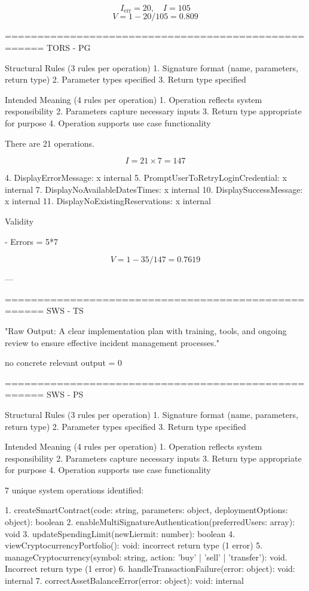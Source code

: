 \[
I_{\text{err}} = 20, \quad I = 105
\]
\[
V = 1 - 20/105 = 0.809
\]

====================================================
TORS - PG

Structural Rules (3 rules per operation)
1. Signature format (name, parameters, return type)
2. Parameter types specified
3. Return type specified

Intended Meaning (4 rules per operation)
1. Operation reflects system responsibility
2. Parameters capture necessary inputs
3. Return type appropriate for purpose
4. Operation supports use case functionality

There are 21 operations.

\[
I = 21 \times 7 = 147
\]

4. DisplayErrorMessage: x internal
5. PromptUserToRetryLoginCredential: x internal
7. DisplayNoAvailableDatesTimes: x internal
10. DisplaySuccessMessage: x internal
11. DisplayNoExistingReservations: x internal

Validity

- Errors = 5*7

\[
V = 1 - 35/147 = 0.7619\]

---

====================================================
SWS - TS

"Raw Output: A clear implementation plan with training, tools, and ongoing review to ensure effective incident management processes."

no concrete relevant output  = 0

====================================================
SWS - PS

Structural Rules (3 rules per operation)
1. Signature format (name, parameters, return type)
2. Parameter types specified
3. Return type specified

Intended Meaning (4 rules per operation)
1. Operation reflects system responsibility
2. Parameters capture necessary inputs
3. Return type appropriate for purpose
4. Operation supports use case functionality

7 unique system operations identified:

1. createSmartContract(code: string, parameters: object, deploymentOptions: object): boolean
2. enableMultiSignatureAuthentication(preferredUsers: array): void
3. updateSpendingLimit(newLiermit: number): boolean
4. viewCryptocurrencyPortfolio(): void: incorrect return type (1 error)
5. manageCryptocurrency(symbol: string, action: 'buy' | 'sell' | 'transfer'): void. Incorrect return type (1 error)
6. handleTransactionFailure(error: object): void: internal 
7. correctAssetBalanceError(error: object): void: internal

